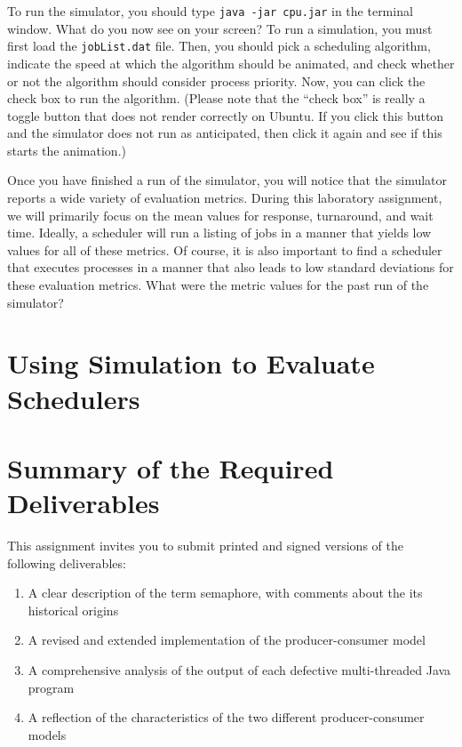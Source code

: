   To run the simulator, you should type {\tt java -jar cpu.jar} in the terminal window.  What do you now see on your
  screen? To run a simulation, you must first load the {\tt jobList.dat} file.  Then, you should pick a scheduling
  algorithm, indicate the speed at which the algorithm should be animated, and check whether or not the algorithm should
  consider process priority. Now, you can click the check box to run the algorithm. (Please note that the ``check box''
  is really a toggle button that does not render correctly on Ubuntu. If you click this button and the simulator does
  not run as anticipated, then click it again and see if this starts the animation.)

  Once you have finished a run of the simulator, you will notice that the simulator reports a wide variety of evaluation
  metrics. During this laboratory assignment, we will primarily focus on the mean values for response, turnaround, and
  wait time. Ideally, a scheduler will run a listing of jobs in a manner that yields low values for all of these
  metrics. Of course, it is also important to find a scheduler that executes processes in a manner that also leads to low
  standard deviations for these evaluation metrics. What were the metric values for the past run of the simulator?

\section*{Using Simulation to Evaluate Schedulers}

\section*{Summary of the Required Deliverables}

This assignment invites you to submit printed and signed versions of the following deliverables: 

\begin{enumerate}

  \item A clear description of the term semaphore, with comments about the its historical origins 

  \item A revised and extended implementation of the producer-consumer model

  \item A comprehensive analysis of the output of each defective multi-threaded Java program

  \item A reflection of the characteristics of the two different producer-consumer models

\end{enumerate}

